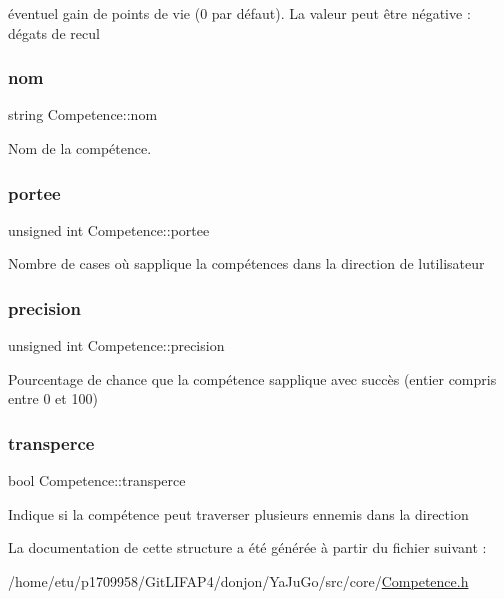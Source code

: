 éventuel gain de points de vie (0 par défaut). La valeur peut être négative \+: dégats de recul \mbox{\label{structCompetence_ae63b4d33134d0eb356453ee6fcfcf3c5}} 
\subsubsection{\texorpdfstring{nom}{nom}}
{\footnotesize\ttfamily string Competence\+::nom}

Nom de la compétence. \mbox{\label{structCompetence_a7e9d57599f5eea9c6ba7a47a903b62cc}} 
\subsubsection{\texorpdfstring{portee}{portee}}
{\footnotesize\ttfamily unsigned int Competence\+::portee}

Nombre de cases où s\textquotesingle{}applique la compétences dans la direction de l\textquotesingle{}utilisateur \mbox{\label{structCompetence_a6faa4f743cf162f1f21c1b8593cbca72}} 
\subsubsection{\texorpdfstring{precision}{precision}}
{\footnotesize\ttfamily unsigned int Competence\+::precision}

Pourcentage de chance que la compétence s\textquotesingle{}applique avec succès (entier compris entre 0 et 100) \mbox{\label{structCompetence_a9a2c12cc4d9f65e4d9b3276214ba4430}} 
\subsubsection{\texorpdfstring{transperce}{transperce}}
{\footnotesize\ttfamily bool Competence\+::transperce}

Indique si la compétence peut traverser plusieurs ennemis dans la direction 

La documentation de cette structure a été générée à partir du fichier suivant \+:\begin{DoxyCompactItemize}
\item 
/home/etu/p1709958/\+Git\+L\+I\+F\+A\+P4/donjon/\+Ya\+Ju\+Go/src/core/\mbox{\hyperlink{Competence_8h}{Competence.\+h}}\end{DoxyCompactItemize}
